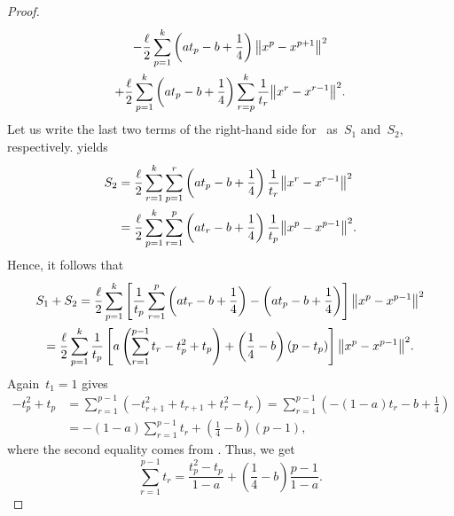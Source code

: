 \documentclass[../main]{subfiles}
\begin{document}
\begin{proof}
\begin{multline}
        - \frac{\ell}{2} \sum_{p = 1}^{k} \left( a t_p - b + \frac{1}{4} \right) \norm*{x^p - x^{p + 1}}^2 \\
        + \frac{\ell}{2} \sum_{p = 1}^{k} \left( a t_p - b + \frac{1}{4} \right) \sum_{r = p}^{k} \frac{1}{t_r} \norm*{x^r - x^{r - 1}}^2 
    .\end{multline}
    Let us write the last two terms of the right-hand side for~ as~$S_1$ and~$S_2$, respectively.
     yields
    \begin{equation}
        \begin{split}
            S_2 &= \frac{\ell}{2} \sum_{r = 1}^{k} \sum_{p = 1}^{r} \left( a t_p - b + \frac{1}{4} \right) \frac{1}{t_r} \norm*{x^r - x^{r - 1}}^2 \\
                &= \frac{\ell}{2} \sum_{p = 1}^{k} \sum_{r = 1}^{p} \left( a t_r - b + \frac{1}{4} \right) \frac{1}{t_p} \norm*{x^p - x^{p - 1}}^2
        .\end{split}
    \end{equation}
    Hence, it follows that
    \begin{multline} \label{eq:s_1 + s_2}
         S_1 + S_2 = \frac{\ell}{2} \sum_{p = 1}^{k} \left[ \frac{1}{t_p} \sum_{r = 1}^{p} \left( a t_r - b + \frac{1}{4} \right) - \left( a t_p - b + \frac{1}{4} \right) \right] \norm*{x^p - x^{p - 1}}^2 \\
         = \frac{\ell}{2} \sum_{p = 1}^{k} \frac{1}{t_p} \left[ a \left( \sum_{r = 1}^{p - 1} t_r - t_p^2 + t_p \right) + \left( \frac{1}{4} - b \right) (p - t_p) \right] \norm*{x^p - x^{p - 1}}^2
    .\end{multline}
    Again~$t_1 = 1$ gives
    \begin{equation}
        \begin{split}
            - t_p^2 + t_p &= \sum_{r = 1}^{p - 1} ( - t_{r + 1}^2 + t_{r + 1} + t_r^2 - t_r ) = \sum_{r = 1}^{p - 1} \left(- (1 - a) t_r - b + \frac{1}{4} \right) \\
                          &= - (1 - a) \sum_{r = 1}^{p - 1} t_r + \left( \frac{1}{4} - b \right) (p - 1)
        ,\end{split}
    \end{equation}
    where the second equality comes from .
    Thus, we get
    \begin{equation} \label{eq:sum t}
        \sum_{r = 1}^{p - 1} t_r = \frac{t_p^2 - t_p}{1 - a} + \left( \frac{1}{4} - b \right) \frac{p - 1}{1 - a}
    .\end{equation} 

\end{proof}
\end{document}
